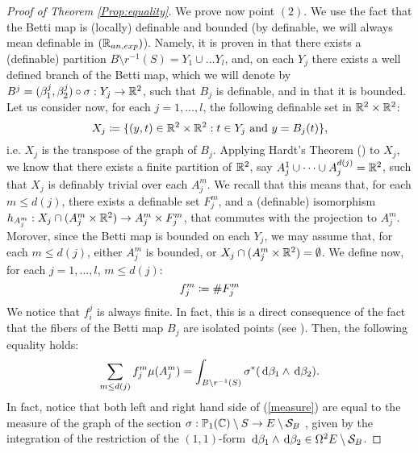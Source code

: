 \documentclass[a4paper,12pt]{article}
\begin{document}
\begin{proof}[Proof of Theorem \ref{Prop:equality}]
	We prove now point $(2)$. We use the fact that the Betti map is (locally) definable and bounded (by definable, we will always mean definable in $(\mathbb R_{an,exp})$). Namely, it is proven in \cite[Section 10]{garethschmidt} that there exists a (definable) partition $B\setminus r^{-1}(S)=Y_1 \cup \dots Y_l$, and, on each $Y_j$ there exists a well defined branch of the Betti map, which we will denote by $B^j=(\beta^j_1,\beta^j_2)\circ \sigma: Y_j \rightarrow \mathbb R^2$, such that $B_j$ is definable, and in \cite[Proposition 4]{garethschmidt} that it is bounded. Let us consider now, for each $j=1,\dots, l$, the following definable set in $\mathbb R^2 \times \mathbb R^2$:
	\[
	X_j\coloneqq \{(y,t) \in \mathbb R^2 \times \mathbb R^2: t \in Y_j \text{ and } y=B_j(t)\},
	\]
	i.e. $X_j$ is the transpose of the graph of $B_j$. Applying Hardt's Theorem (\cite[Theorem 9.1.2]{tametopology}) to $X_j$, we know that there exists a finite partition of $\mathbb R^2$, say $A_j^1\cup\dots \cup A_j^{d(j)}=\mathbb R^2$, such that $X_j$ is definably trivial over each $A_j^m$.  We recall that this means that, for each $m \leq d(j)$, there exists a definable set $F_j^m$, and a (definable) isomorphism $h_{A_j^m}:X_j\cap (A_j^m\times \mathbb R^2)\rightarrow A_j^m\times F_j^m$, that commutes with the projection to $A_j^m$. Morover, since the Betti map is bounded on each $Y_j$, we may assume that, for each $m \leq d(j)$, either $A_j^m$ is bounded, or $X_j\cap (A_j^m\times \mathbb R^2)=\emptyset$. We define now, for each $j=1,\dots, l$, $m \leq d(j)$:
	\begin{equation}
		f_j^m\coloneqq \#F_j^m
	\end{equation}
	We notice that $f_i^j$ is always finite. In fact, this is a direct consequence of the fact that the fibers of the Betti map $B_j$ are isolated points (see \cite[Proposition 1.1]{bettitorsion}).
	Then, the following equality holds:
	\begin{equation}\label{measure}
	\sum_{m \leq d(j)} f_{j}^m\mu(A_j^m)=\int_{B\setminus r^{-1}(S)} \sigma^*(\,\mathrm d \beta_1 \wedge \,\mathrm d \beta_2).
	\end{equation}
	In fact, notice that both left and right hand side of (\ref{measure}) are equal to the measure of the graph of the section $\sigma:\mathbb{P}_1(\mathbb C)\setminus S\rightarrow E\setminus \mathcal{S}_B$ %
	, given by the integration of the restriction of the $(1,1)$-form $\,\mathrm d \beta_1 \wedge \,\mathrm d \beta_2 \in \Omega^2{E \setminus \mathcal{S}_B}$.
	

\end{proof}
\end{document}
